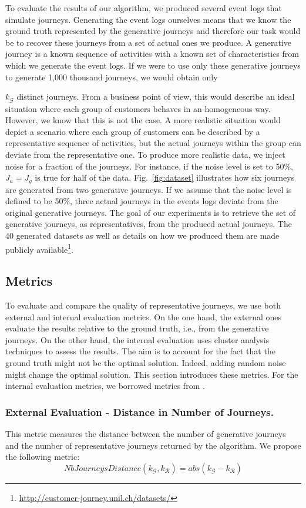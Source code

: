 \documentclass[runningheads]{llncs}
\begin{document}
{{To evaluate the results of our algorithm, we produced several event logs that simulate journeys. Generating the event logs ourselves means that we know the ground truth represented by the generative journeys and therefore our task would be to recover these journeys from a set of actual ones we produce. A generative journey is a known sequence of activities with a known set of characteristics from which we generate the event logs. If we were to use only these generative journeys to generate 1,000 thousand journeys, we would obtain only {$k_{\mathcal{G}}$ distinct journeys. From a business point of view, this would describe an ideal situation where each group of customers behaves in an homogeneous way. However, we know that this is not the case. A more realistic situation would depict a scenario where each group of customers can be described by a representative sequence of activities, but the actual journeys within the group can deviate from the representative one. To produce more realistic data, we inject noise for a fraction of the journeys. For instance, if the noise level is set to 50\%, $J_a = J_g$ is true for half of the data. Fig.~\ref{fig:dataset} illustrates how six journeys are generated from two generative journeys. If we assume that the noise level is defined to be 50\%, three actual journeys in the events logs deviate from the original generative journeys. The goal of our experiments is to retrieve the set of generative journeys, as representatives, from the produced actual journeys. The 40 generated datasets as well as details on how we produced them are made publicly available\footnote{\url{http://customer-journey.unil.ch/datasets/}}.

\subsection{Metrics}
To evaluate and compare the quality of representative journeys, we use both external and internal evaluation metrics. On the one hand, the external ones evaluate the results relative to the ground truth, i.e., from the generative journeys. On the other hand, the internal evaluation uses cluster analysis techniques to assess the results. The aim is to account for the fact that the ground truth might not be the optimal solution. Indeed, adding random noise might change the optimal solution. This section introduces these metrics. For the internal evaluation metrics, we borrowed metrics from \cite{gabadinho2009extracting}.


\subsubsection{External Evaluation - Distance in Number of Journeys.} This metric measures the distance between the number of generative journeys and the number of representative journeys returned by the algorithm. We propose the following metric:
\begin{equation}
    NbJourneysDistance({k_{\mathcal{G}}}, {k_{\mathcal{R}}}) = abs({k_{\mathcal{G}}} - {k_{\mathcal{R}}}) 
\end{equation}

}}}
\end{document}
